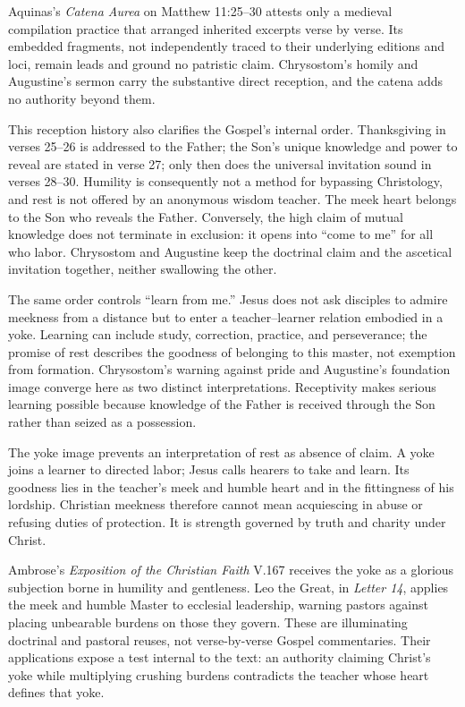 Aquinas's \emph{Catena Aurea} on Matthew 11:25--30 attests only a medieval compilation practice that arranged inherited excerpts verse by verse. Its embedded fragments, not independently traced to their underlying editions and loci, remain leads and ground no patristic claim. Chrysostom's homily and Augustine's sermon carry the substantive direct reception, and the catena adds no authority beyond them.

This reception history also clarifies the Gospel's internal order. Thanksgiving in verses 25--26 is addressed to the Father; the Son's unique knowledge and power to reveal are stated in verse 27; only then does the universal invitation sound in verses 28--30. Humility is consequently not a method for bypassing Christology, and rest is not offered by an anonymous wisdom teacher. The meek heart belongs to the Son who reveals the Father. Conversely, the high claim of mutual knowledge does not terminate in exclusion: it opens into “come to me” for all who labor. Chrysostom and Augustine keep the doctrinal claim and the ascetical invitation together, neither swallowing the other.

The same order controls “learn from me.” Jesus does not ask disciples to admire meekness from a distance but to enter a teacher--learner relation embodied in a yoke. Learning can include study, correction, practice, and perseverance; the promise of rest describes the goodness of belonging to this master, not exemption from formation. Chrysostom's warning against pride and Augustine's foundation image converge here as two distinct interpretations. Receptivity makes serious learning possible because knowledge of the Father is received through the Son rather than seized as a possession.

The yoke image prevents an interpretation of rest as absence of claim. A yoke joins a learner to directed labor; Jesus calls hearers to take and learn. Its goodness lies in the teacher's meek and humble heart and in the fittingness of his lordship. Christian meekness therefore cannot mean acquiescing in abuse or refusing duties of protection. It is strength governed by truth and charity under Christ.

Ambrose's \emph{Exposition of the Christian Faith} V.167 receives the yoke as a glorious subjection borne in humility and gentleness. Leo the Great, in \emph{Letter 14}, applies the meek and humble Master to ecclesial leadership, warning pastors against placing unbearable burdens on those they govern. These are illuminating doctrinal and pastoral reuses, not verse-by-verse Gospel commentaries. Their applications expose a test internal to the text: an authority claiming Christ's yoke while multiplying crushing burdens contradicts the teacher whose heart defines that yoke.

